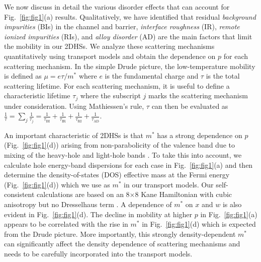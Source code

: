 \documentclass[reprint,amsmath,amssymb,aps,prl,nobibnotes,superscriptaddress]{revtex4-1}
\begin{document}
We now discuss in detail the various disorder effects that can account for Fig.~\ref{fig:fig1}(a) results. Qualitatively, we have identified that residual \textit{background impurities} (BIs) in the channel and barrier, \textit{interface roughness} (IR), \textit{remote ionized impurities} (RIs), and \textit{alloy disorder} (AD) are the main factors that limit the mobility in our 2DHSs. We analyze these scattering mechanisms quantitatively using transport models and obtain the dependence on $p$ for each scattering mechanism. In the simple Drude picture, the low-temperature mobility is defined as $\mu= e\tau/m^*$ where $e$ is the fundamental charge and $\tau$ is the total scattering lifetime. For each scattering mechanism, it is useful to define a characteristic lifetime $\tau_j$ where the subscript $j$ marks the scattering mechanism under consideration. Using Mathiessen’s rule, $\tau$ can then be evaluated as $\frac{1}{\tau}=\sum\limits_{j} \frac{1}{\tau_j}=\frac{1}{\tau_\textrm{BI}}+\frac{1}{\tau_\textrm{IR}}+\frac{1}{\tau_\textrm{RI}}+\frac{1}{\tau_\textrm{AD}}$.

An important characteristic of 2DHSs is that $m^*$ has a strong dependence on $p$ (Fig.~\ref{fig:fig1}(d)) arising from non-parabolicity of the valence band due to mixing of the heavy-hole and light-hole bands \cite{Winkler2003, Zhu2007, Watson2012, Chung2022holes}. To take this into account, we calculate hole energy-band dispersions for each case in Fig.~\ref{fig:fig1}(a) and then determine the density-of-states (DOS) effective mass at the Fermi energy (Fig.~\ref{fig:fig1}(d)) which we use as $m^*$ in our transport models. Our self-consistent calculations are based on an 8$\times$8 Kane Hamiltonian with cubic anisotropy but no Dresselhaus term \cite{Winkler2003,footnote1}. A dependence of $m^*$ on $x$ and $w$ is also evident in Fig.~\ref{fig:fig1}(d).  The decline in mobility at higher $p$ in Fig.~\ref{fig:fig1}(a) appears to be correlated with the rise in $m^*$ in Fig.~\ref{fig:fig1}(d) which is expected from the Drude picture. More importantly, this strongly density-dependent $m^*$ can significantly affect the density dependence of scattering mechanisms and needs to be carefully incorporated into the transport models. 
\end{document}
